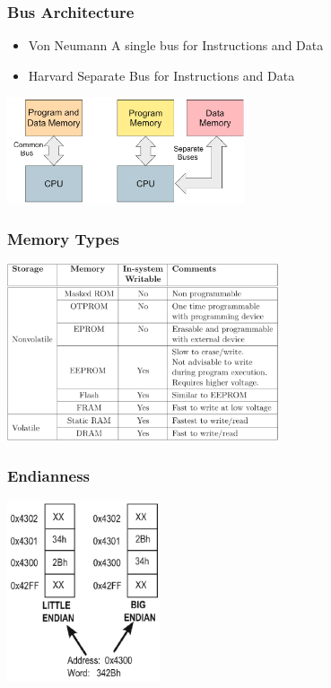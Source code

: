 \subsubsection{Bus Architecture}
\begin{minipage}{9cm}
    \begin{itemize}
        \item Von Neumann
        \subitem A single bus for Instructions and Data
        \item Harvard
        \subitem Separate Bus for Instructions and Data
    \end{itemize}
\end{minipage}
\begin{minipage}{7cm}
    \includegraphics[width=7cm]{images/bus.png}
\end{minipage}

\begin{multicols}{2}
\subsubsection{Memory Types}
\includegraphics[width=8cm]{images/memorytypes.png}

\subsubsection{Endianness}
\includegraphics[width=4.5cm]{images/be_le.png}
\end{multicols}

